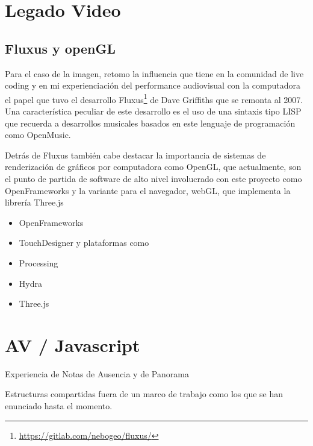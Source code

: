 \section{Legado Video}

\subsection{Fluxus y openGL}

Para el caso de la imagen, retomo la influencia que tiene en la comunidad de live coding y en mi experienciación del performance audiovisual con la computadora el papel que tuvo el desarrollo Fluxus\footnote{\url{https://gitlab.com/nebogeo/fluxus/}} de Dave Griffiths que se remonta al 2007. Una característica peculiar de este desarrollo es el uso de una sintaxis tipo LISP que recuerda a desarrollos musicales basados en este lenguaje de programación como OpenMusic. 

Detrás de Fluxus también cabe destacar la importancia de sistemas de renderización de gráficos por computadora como OpenGL, que actualmente, son el punto de partida de software de alto nivel involucrado con este proyecto como OpenFrameworks y la variante para el navegador, webGL, que implementa la librería Three.js 



\begin{itemize}
\item OpenFrameworks 
\item TouchDesigner y plataformas como 
\item Processing
\item Hydra
\item Three.js 
\end{itemize}

\section{AV / Javascript}

Experiencia de Notas de Ausencia y de Panorama 

Estructuras compartidas fuera de un marco de trabajo como los que se han enunciado hasta el momento.
